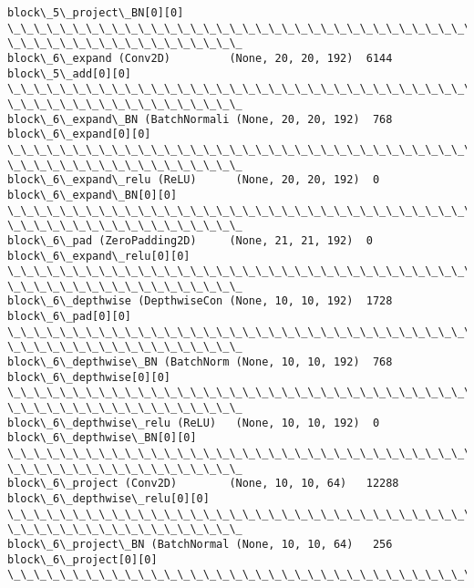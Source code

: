 \documentclass[11pt]{article}
\begin{document}
\begin{Verbatim}[commandchars=\\\{\}]
block\_5\_project\_BN[0][0]
\_\_\_\_\_\_\_\_\_\_\_\_\_\_\_\_\_\_\_\_\_\_\_\_\_\_\_\_\_\_\_\_\_\_\_\_\_\_\_\_\_\_\_\_\_\_\_\_\_\_\_\_\_\_\_\_\_\_\_\_\_\_\_\_\_\_\_\_\_\_\_\_\_\_\_\_\_\_\_\_
\_\_\_\_\_\_\_\_\_\_\_\_\_\_\_\_\_\_
block\_6\_expand (Conv2D)         (None, 20, 20, 192)  6144
block\_5\_add[0][0]
\_\_\_\_\_\_\_\_\_\_\_\_\_\_\_\_\_\_\_\_\_\_\_\_\_\_\_\_\_\_\_\_\_\_\_\_\_\_\_\_\_\_\_\_\_\_\_\_\_\_\_\_\_\_\_\_\_\_\_\_\_\_\_\_\_\_\_\_\_\_\_\_\_\_\_\_\_\_\_\_
\_\_\_\_\_\_\_\_\_\_\_\_\_\_\_\_\_\_
block\_6\_expand\_BN (BatchNormali (None, 20, 20, 192)  768
block\_6\_expand[0][0]
\_\_\_\_\_\_\_\_\_\_\_\_\_\_\_\_\_\_\_\_\_\_\_\_\_\_\_\_\_\_\_\_\_\_\_\_\_\_\_\_\_\_\_\_\_\_\_\_\_\_\_\_\_\_\_\_\_\_\_\_\_\_\_\_\_\_\_\_\_\_\_\_\_\_\_\_\_\_\_\_
\_\_\_\_\_\_\_\_\_\_\_\_\_\_\_\_\_\_
block\_6\_expand\_relu (ReLU)      (None, 20, 20, 192)  0
block\_6\_expand\_BN[0][0]
\_\_\_\_\_\_\_\_\_\_\_\_\_\_\_\_\_\_\_\_\_\_\_\_\_\_\_\_\_\_\_\_\_\_\_\_\_\_\_\_\_\_\_\_\_\_\_\_\_\_\_\_\_\_\_\_\_\_\_\_\_\_\_\_\_\_\_\_\_\_\_\_\_\_\_\_\_\_\_\_
\_\_\_\_\_\_\_\_\_\_\_\_\_\_\_\_\_\_
block\_6\_pad (ZeroPadding2D)     (None, 21, 21, 192)  0
block\_6\_expand\_relu[0][0]
\_\_\_\_\_\_\_\_\_\_\_\_\_\_\_\_\_\_\_\_\_\_\_\_\_\_\_\_\_\_\_\_\_\_\_\_\_\_\_\_\_\_\_\_\_\_\_\_\_\_\_\_\_\_\_\_\_\_\_\_\_\_\_\_\_\_\_\_\_\_\_\_\_\_\_\_\_\_\_\_
\_\_\_\_\_\_\_\_\_\_\_\_\_\_\_\_\_\_
block\_6\_depthwise (DepthwiseCon (None, 10, 10, 192)  1728
block\_6\_pad[0][0]
\_\_\_\_\_\_\_\_\_\_\_\_\_\_\_\_\_\_\_\_\_\_\_\_\_\_\_\_\_\_\_\_\_\_\_\_\_\_\_\_\_\_\_\_\_\_\_\_\_\_\_\_\_\_\_\_\_\_\_\_\_\_\_\_\_\_\_\_\_\_\_\_\_\_\_\_\_\_\_\_
\_\_\_\_\_\_\_\_\_\_\_\_\_\_\_\_\_\_
block\_6\_depthwise\_BN (BatchNorm (None, 10, 10, 192)  768
block\_6\_depthwise[0][0]
\_\_\_\_\_\_\_\_\_\_\_\_\_\_\_\_\_\_\_\_\_\_\_\_\_\_\_\_\_\_\_\_\_\_\_\_\_\_\_\_\_\_\_\_\_\_\_\_\_\_\_\_\_\_\_\_\_\_\_\_\_\_\_\_\_\_\_\_\_\_\_\_\_\_\_\_\_\_\_\_
\_\_\_\_\_\_\_\_\_\_\_\_\_\_\_\_\_\_
block\_6\_depthwise\_relu (ReLU)   (None, 10, 10, 192)  0
block\_6\_depthwise\_BN[0][0]
\_\_\_\_\_\_\_\_\_\_\_\_\_\_\_\_\_\_\_\_\_\_\_\_\_\_\_\_\_\_\_\_\_\_\_\_\_\_\_\_\_\_\_\_\_\_\_\_\_\_\_\_\_\_\_\_\_\_\_\_\_\_\_\_\_\_\_\_\_\_\_\_\_\_\_\_\_\_\_\_
\_\_\_\_\_\_\_\_\_\_\_\_\_\_\_\_\_\_
block\_6\_project (Conv2D)        (None, 10, 10, 64)   12288
block\_6\_depthwise\_relu[0][0]
\_\_\_\_\_\_\_\_\_\_\_\_\_\_\_\_\_\_\_\_\_\_\_\_\_\_\_\_\_\_\_\_\_\_\_\_\_\_\_\_\_\_\_\_\_\_\_\_\_\_\_\_\_\_\_\_\_\_\_\_\_\_\_\_\_\_\_\_\_\_\_\_\_\_\_\_\_\_\_\_
\_\_\_\_\_\_\_\_\_\_\_\_\_\_\_\_\_\_
block\_6\_project\_BN (BatchNormal (None, 10, 10, 64)   256
block\_6\_project[0][0]
\_\_\_\_\_\_\_\_\_\_\_\_\_\_\_\_\_\_\_\_\_\_\_\_\_\_\_\_\_\_\_\_\_\_\_\_\_\_\_\_\_\_\_\_\_\_\_\_\_\_\_\_\_\_\_\_\_\_\_\_\_\_\_\_\_\_\_\_\_\_\_\_\_\_\_\_\_\_\_\_

\end{Verbatim}
\end{document}
